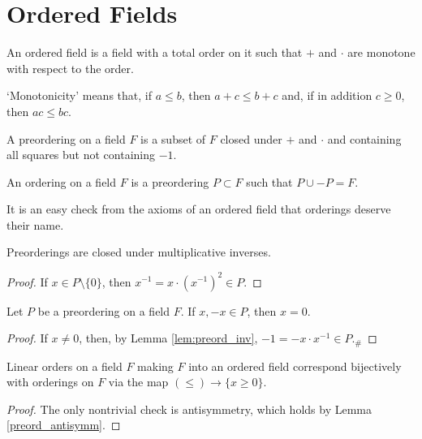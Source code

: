 \section{Ordered Fields}

\begin{definition}
  \label{def:ordered_field}
  \leanok
  An ordered field is a field with a total order on it such that $+$ and $\cdot$ are monotone with respect to the order.
\end{definition}

`Monotonicity' means that, if $a\leq b$, then $a+c\leq b+c$ and, if in addition $c\geq0$, then $ac\leq bc$.

\begin{definition}
  \label{def:preordering}
  \leanok
  A preordering on a field $F$ is a subset of $F$ closed under $+$ and $\cdot$ and containing all squares but not containing $-1$.
\end{definition}

\begin{definition}
  \label{def:ordering}
  \leanok
  An ordering on a field $F$ is a preordering $P\subset F$ such that $P\cup -P=F$.
\end{definition}

It is an easy check from the axioms of an ordered field that orderings deserve their name.

\begin{lemma}
  \label{lem:preord_inv}
  \leanok
  Preorderings are closed under multiplicative inverses.
\end{lemma}
\begin{proof}
  \leanok
  If $x\in P\setminus\{0\}$, then $x^{-1}=x\cdot(x^{-1})^2\in P$.
\end{proof}

\begin{lemma}
  \label{lem:preord_antisymm}
  \leanok
  Let $P$ be a preordering on a field $F$. If $x,-x\in P$, then $x=0$.
\end{lemma}
\begin{proof}
  If $x\neq0$, then, by Lemma \ref{lem:preord_inv}, $-1=-x\cdot x^{-1}\in P$.$_\#$
\end{proof}

\begin{lemma}
  \label{lem:linord_fieldord_bij}
  \leanok
  Linear orders on a field $F$ making $F$ into an ordered field correspond bijectively with orderings on $F$ via the map $(\leq)\to\{x\geq0\}$.
\end{lemma}
\begin{proof}
  \leanok
  The only nontrivial check is antisymmetry, which holds by Lemma \ref{preord_antisymm}.
\end{proof}

